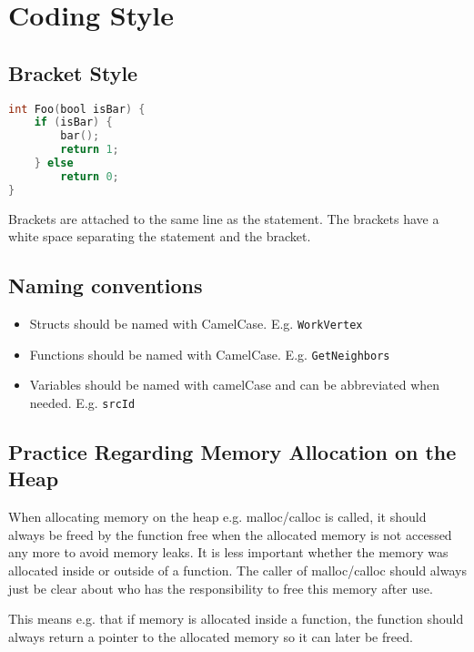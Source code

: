 \section{Coding Style}

\subsection{Bracket Style}

\begin{lstlisting}[style=customc, language=C]
int Foo(bool isBar) {
    if (isBar) {
        bar();
        return 1;
    } else
        return 0;
}
\end{lstlisting}

Brackets are attached to the same line as the statement. The brackets have a white space separating the statement and the bracket.

\subsection{Naming conventions}

\begin{itemize}
	\item Structs should be named with CamelCase. E.g. \texttt{WorkVertex}
	\item Functions should be named with CamelCase. E.g. \texttt{GetNeighbors}
	\item Variables should be named with camelCase and can be abbreviated when needed. E.g. \texttt{srcId}
\end{itemize}

\subsection{Practice Regarding Memory Allocation on the Heap}
When allocating memory on the heap e.g. malloc/calloc is called, it should always be freed by the function free when the allocated memory is not accessed any more to avoid memory leaks. It is less important whether the memory was allocated inside or outside of a function. The caller of malloc/calloc should always just be clear about who has the responsibility to free this memory after use. 

This means e.g. that if memory is allocated inside a function, the function should always return a pointer to the allocated memory so it can later be freed.